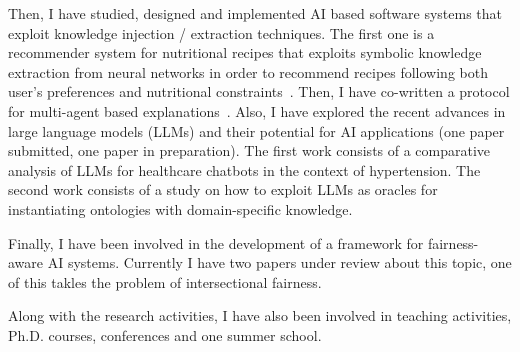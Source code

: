 \documentclass[]{scrartcl}
\begin{document}
    Then, I have studied, designed and implemented AI based software systems that exploit knowledge injection / extraction techniques.
    The first one is a recommender system for nutritional recipes that exploits symbolic knowledge extraction from neural networks in order to recommend recipes following both user's preferences and nutritional constraints~\cite{skerecommender-cmbp235}.
    Then, I have co-written a protocol for multi-agent based explanations~\cite{explanationprotocol-extraamas2023}.
    Also, I have explored the recent advances in large language models (LLMs) and their potential for AI applications (one paper submitted, one paper in preparation).
    The first work consists of a comparative analysis of LLMs for healthcare chatbots in the context of hypertension.
    The second work consists of a study on how to exploit LLMs as oracles for instantiating ontologies with domain-specific knowledge.

    Finally, I have been involved in the development of a framework for fairness-aware AI systems.
    Currently I have two papers under review about this topic, one of this takles the problem of intersectional fairness.

    Along with the research activities, I have also been involved in teaching activities, Ph.D. courses, conferences and one summer school.
\end{document}
